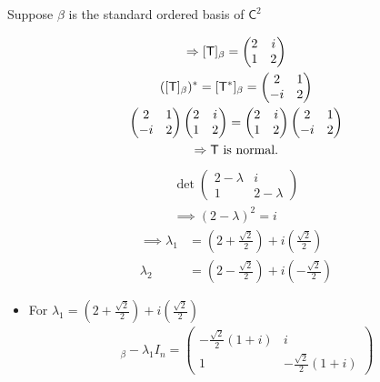 \begin{enumerate}
Suppose $\beta$ is the standard ordered basis of $\mathsf{C}^2$

\begin{gather}
\implies [\mathsf{T}]_\beta = \begin{pmatrix}
2 & i\\
1 & 2
\end{pmatrix}\\
([\mathsf{T}]_\beta)^* = [\mathsf{T}^*]_\beta = \begin{pmatrix}
2 & 1\\
-i & 2
\end{pmatrix}\\
\begin{pmatrix}
2 & 1\\
-i & 2
\end{pmatrix}
\begin{pmatrix}
2 & i\\
1 & 2
\end{pmatrix}
=
\begin{pmatrix}
2 & i\\
1 & 2
\end{pmatrix}
\begin{pmatrix}
2 & 1\\
-i & 2
\end{pmatrix}\\
\notag \implies \mathsf{T} \text{ is normal.}
\end{gather}
\begin{gather}
\det{\begin{pmatrix}
2- \lambda & i\\
1 & 2 -\lambda
  \end{pmatrix}
}\\
\implies (2 -\lambda)^2 = i
\end{gather}
\begin{align}
\implies \lambda_1 &= \left(2 + \frac{\sqrt{2}}{2}\right) +
i\left(\frac{\sqrt{2}}{2}\right) \\
\lambda_2 &=  \left(2 - \frac{\sqrt{2}}{2}\right) +
i\left(-\frac{\sqrt{2}}{2}\right)
\end{align}
\begin{itemize}
\item For $\lambda_1 = \left(2 + \frac{\sqrt{2}}{2}\right) +
i\left(\frac{\sqrt{2}}{2}\right)$
\begin{gather}
[\mathsf{T}]_\beta -\lambda_1I_n = \begin{pmatrix}
-\frac{\sqrt{2}}{2}(1+i) & i\\
1 & -\frac{\sqrt{2}}{2}(1+i)
\end{pmatrix}\\

\end{gather}
\end{itemize}
\end{enumerate}
